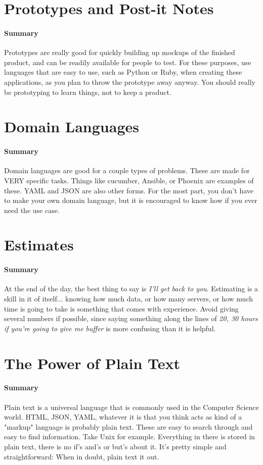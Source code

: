 \documentclass{article}
\begin{document}
\section{Prototypes and Post-it Notes}
    \paragraph{Summary} Prototypes are really good for quickly building up mockups of the finished product, and can be readily available for people to test. For these purposes, use languages that are easy to use, such as Python or Ruby, when creating these applications, as you plan to throw the prototype away anyway. You should really be prototyping to learn things, not to keep a product.

\section{Domain Languages}
    \paragraph{Summary} Domain languages are good for a couple types of problems. These are made for VERY specific tasks. Things like cucumber, Ansible, or Phoenix are examples of these. YAML and JSON are also other forms. For the most part, you don't have to make your own domain language, but it is encouraged to know how if you ever need the use case.

\section{Estimates}
    \paragraph{Summary} At the end of the day, the best thing to say is \textit{I'll get back to you}. Estimating is a skill in it of itself... knowing how much data, or how many servers, or how much time is going to take is something that comes with experience. Avoid giving several numbers if possible, since saying something along the lines of \textit{20, 30 hours if you're going to give me buffer} is more confusing than it is helpful.

\section{The Power of Plain Text}
    \paragraph{Summary} Plain text is a universal language that is commonly used in the Computer Science world. HTML, JSON, YAML, whatever it is that you think acts as kind of a "markup" language is probably plain text. These are easy to search through and easy to find information. Take Unix for example. Everything in there is stored in plain text, there is no if's and's or but's about it. It's pretty simple and straightforward: When in doubt, plain text it out.
\end{document}

